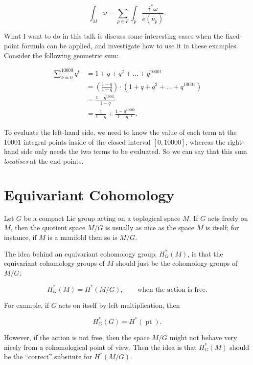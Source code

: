 \documentclass{article}
\newcommand{\w}{\omega}
\DeclareMathOperator{\pt}{pt}
\begin{document}
$$ \int_{M} \w = \sum\limits_{p \in F} \int_{p} \frac{i^{\ast}\w}{e(\nu_{p})}. $$

What I want to do in this talk is discuss some interesting cases when the fixed-point formula can be applied, and investigate how to use it in these examples. 
Consider the following geometric sum:

\begin{equation*}
	\begin{split}
		\sum\limits_{k=0}^{10000} q^{k} &= 1 + q + q^{2} + \ldots + q^{10001} \\
		&= \left(\frac{1-q}{1-q}\right)\cdot(1 + q + q^{2} + \ldots + q^{10001}) \\
		&= \frac{1 - q^{10001}}{1 - q} \\
		&= \frac{1}{1 - q} + \frac{1 - q^{10000}}{1 - q^{-1}}.
	\end{split}
\end{equation*}

To evaluate the left-hand side, we need to know the value of each term at the 10001 integral points inside of the closed interval $[0, 10000]$, whereas the right-hand side only needs the two terms to be evaluated. So we can say that this sum \emph{localises} at the end points.

\section{Equivariant Cohomology}

Let $G$ be a compact Lie group acting on a toplogical space $M$. If $G$ acts freely on $M$, then the quotient space $M/G$ is usually as nice as the space $M$ is itself; for instance, if $M$ is a manifold then so is $M/G$.

The idea behind an equivariant cohomology group, $H_{G}^{\ast}(M)$, is that the equivariant cohomology groups of $M$ should just be the cohomology groups of $M/G$:

\begin{equation*}
	H_{G}^{\ast}(M) = H^{\ast}(M/G), \qquad \text{when the action is free.}
\end{equation*}

For example, if $G$ acts on itself by left multiplication, then

\begin{equation*}
	H_{G}^{\ast}(G) = H^{\ast}(\pt).
\end{equation*}

However, if the action is not free, then the space $M/G$ might not behave very nicely from a cohomological point of view. Then the idea is that $H_{G}^{\ast}(M)$ should be the ``correct'' subsitute for $H^{\ast}(M/G)$.
\end{document}
